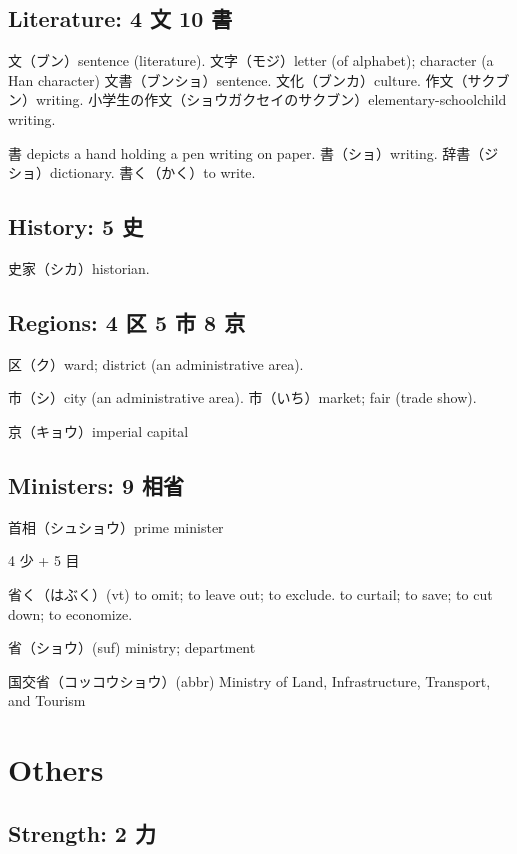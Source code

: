 \subsection{Literature: 4 文 10 書}

文（ブン）sentence (literature).
文字（モジ）letter (of alphabet); character (a Han character)
文書（ブンショ）sentence.
文化（ブンカ）culture.
作文（サクブン）writing.
小学生の作文（ショウガクセイのサクブン）elementary-schoolchild writing.

書 depicts a hand holding a pen writing on paper.
書（ショ）writing.
辞書（ジショ）dictionary.
書く（かく）to write.

\subsection{History: 5 史}

史家（シカ）historian.

\subsection{Regions: 4 区 5 市 8 京}

区（ク）ward; district (an administrative area).

市（シ）city (an administrative area).
市（いち）market; fair (trade show).

京（キョウ）imperial capital

\subsection{Ministers: 9 相省}

首相（シュショウ）prime minister

4 少 + 5 目

省く（はぶく）(vt)
to omit; to leave out; to exclude.
to curtail; to save; to cut down; to economize.

省（ショウ）(suf) ministry; department

国交省（コッコウショウ）(abbr)
Ministry of Land, Infrastructure, Transport, and Tourism

\section{Others}

\subsection{Strength: 2 力}


